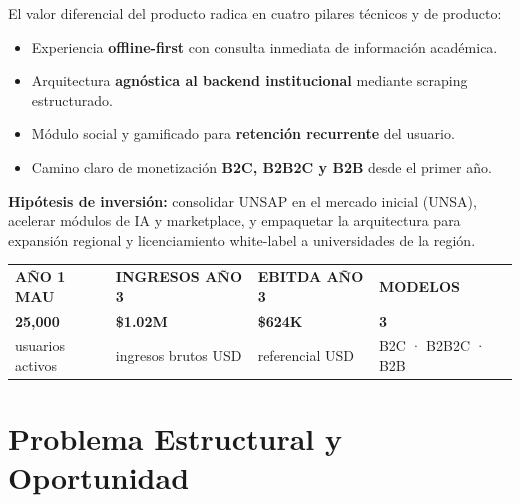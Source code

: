 \documentclass[10.5pt,a4paper]{article}
\begin{document}
El valor diferencial del producto radica en cuatro pilares técnicos y de producto:

\begin{itemize}
  \item Experiencia \textbf{offline-first} con consulta inmediata de información académica.
  \item Arquitectura \textbf{agnóstica al backend institucional} mediante scraping estructurado.
  \item Módulo social y gamificado para \textbf{retención recurrente} del usuario.
  \item Camino claro de monetización \textbf{B2C, B2B2C y B2B} desde el primer año.
\end{itemize}

\begin{signalbox}
\textbf{Hipótesis de inversión:} consolidar UNSAP en el mercado inicial (UNSA), acelerar módulos de IA y marketplace, y empaquetar la arquitectura para expansión regional y licenciamiento white-label a universidades de la región.
\end{signalbox}

\vspace{0.4cm}

\begin{darkbox}
\begin{tabular}{@{} p{3.5cm} p{3.5cm} p{3.5cm} p{3.5cm} @{}}
  {\color{unsaGold}\footnotesize\bfseries AÑO 1 MAU}  &
  {\color{unsaGold}\footnotesize\bfseries INGRESOS AÑO 3} &
  {\color{unsaGold}\footnotesize\bfseries EBITDA AÑO 3} &
  {\color{unsaGold}\footnotesize\bfseries MODELOS} \\[4pt]
  {\large\bfseries 25,000}    &
  {\large\bfseries \$1.02M}   &
  {\large\bfseries \$624K}    &
  {\large\bfseries 3} \\[2pt]
  {\scriptsize\color{unsaMuted}usuarios activos} &
  {\scriptsize\color{unsaMuted}ingresos brutos USD} &
  {\scriptsize\color{unsaMuted}referencial USD} &
  {\scriptsize\color{unsaMuted}B2C · B2B2C · B2B}
\end{tabular}
\end{darkbox}


\section{Problema Estructural y Oportunidad}
\end{document}
